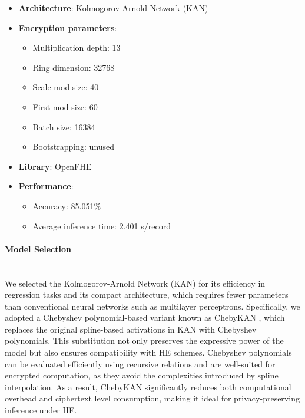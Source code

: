 \documentclass[article]{iacrtrans}
\begin{document}
\begin{itemize}
    \item \textbf{Architecture}: Kolmogorov-Arnold Network (KAN)
    \item \textbf{Encryption parameters}: 
        \begin{itemize}
            \item Multiplication depth: 13
            \item Ring dimension: 32768
            \item Scale mod size: 40
            \item First mod size: 60
            \item Batch size: 16384
            \item Bootstrapping: unused
        \end{itemize}
    \item \textbf{Library}: OpenFHE \cite{OpenFHE}
    \item \textbf{Performance}: 
        \begin{itemize}
            \item Accuracy: 85.051\%
            \item Average inference time: 2.401 s/record
        \end{itemize}
\end{itemize}

\paragraph{Model Selection}\mbox{}\\

We selected the Kolmogorov-Arnold Network (KAN) \cite{liu2025kankolmogorovarnoldnetworks} for its efficiency in regression tasks and its compact architecture, which requires fewer parameters than conventional neural networks such as multilayer perceptrons. Specifically, we adopted a Chebyshev polynomial-based variant known as ChebyKAN \cite{ChebyKAN}, which replaces the original spline-based activations in KAN with Chebyshev polynomials. This substitution not only preserves the expressive power of the model but also ensures compatibility with HE schemes. Chebyshev polynomials can be evaluated efficiently using recursive relations and are well-suited for encrypted computation, as they avoid the complexities introduced by spline interpolation. As a result, ChebyKAN significantly reduces both computational overhead and ciphertext level consumption, making it ideal for privacy-preserving inference under HE.
\end{document}
